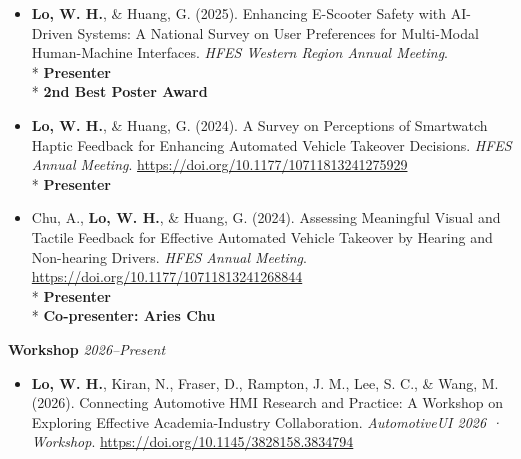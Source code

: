 \documentclass[11pt]{article}
\begin{document}
\begin{itemize}[leftmargin=*, topsep=0pt, itemsep=6pt]
  \item \begin{samepage}\textbf{Lo, W. H.}, \& Huang, G. (2025). Enhancing E-Scooter Safety with AI-Driven Systems: A National Survey on User Preferences for Multi-Modal Human-Machine Interfaces. \textit{HFES Western Region Annual Meeting}.\\* \textbf{Presenter}\\* \textbf{2nd Best Poster Award}
  \par\end{samepage}

  \item \begin{samepage}\textbf{Lo, W. H.}, \& Huang, G. (2024). A Survey on Perceptions of Smartwatch Haptic Feedback for Enhancing Automated Vehicle Takeover Decisions. \textit{HFES Annual Meeting}. \href{https://doi.org/10.1177/10711813241275929}{\url{https://doi.org/10.1177/10711813241275929}}\\* \textbf{Presenter}
  \par\end{samepage}

  \item \begin{samepage}Chu, A., \textbf{Lo, W. H.}, \& Huang, G. (2024). Assessing Meaningful Visual and Tactile Feedback for Effective Automated Vehicle Takeover by Hearing and Non-hearing Drivers. \textit{HFES Annual Meeting}. \href{https://doi.org/10.1177/10711813241268844}{\url{https://doi.org/10.1177/10711813241268844}}\\* \textbf{Presenter}\\* \textbf{Co-presenter: Aries Chu}
  \par\end{samepage}

\end{itemize}

\vspace{0.6em}


\textbf{Workshop} \hfill \textit{2026--Present}

\vspace{0.4em}

\begin{itemize}[leftmargin=*, topsep=0pt, itemsep=6pt]

  \item \begin{samepage}\textbf{Lo, W. H.}, Kiran, N., Fraser, D., Rampton, J. M., Lee, S. C., \& Wang, M. (2026). Connecting Automotive HMI Research and Practice: A Workshop on Exploring Effective Academia-Industry Collaboration. \textit{AutomotiveUI 2026 · Workshop}. \href{https://doi.org/10.1145/3828158.3834794}{\url{https://doi.org/10.1145/3828158.3834794}}
  \par\end{samepage}

\end{itemize}
\end{document}
